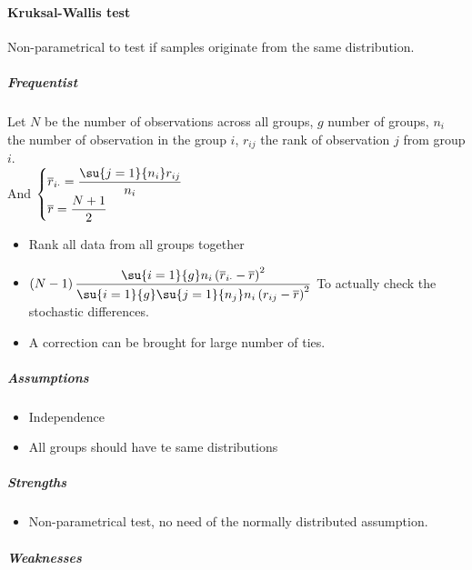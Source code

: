 \paragraph{Kruksal-Wallis test}
Non-parametrical to test if samples originate from the same distribution.
\subparagraph{Frequentist}
Let $N$ be the number of observations across all groups, $g$ number of groups, $n_{i}$ the
number of observation in the group $i$, $r_{ij}$ the rank of observation $j$ from group 
$i$.\\
And 
$\begin{cases}
    \overline{r}_{i\cdot} = \dfrac{\su{j=1}{n_{i}}r_{ij}}{n_{i}} \\
    \overline{r} = \dfrac{N + 1}{2}
\end{cases}$
\begin{itemize}
    \item Rank all data from all groups together
    \item $\left(N-1\right)\dfrac{\su{i=1}{g}n_{i}\left(\overline{r}_{i\cdot} - 
                \overline{r}\right)^{2}}{\su{i=1}{g}\su{j=1}{n_{j}}n_{i}\left(r_{ij} - 
        \overline{r}\right)^{2}}$
        To actually check the stochastic differences.
    \item A correction can be brought for large number of ties.

\end{itemize}

\subparagraph{Assumptions}
\begin{itemize}
    \item Independence
    \item All groups should have te same distributions
\end{itemize}

\subparagraph{Strengths}
\begin{itemize}
    \item Non-parametrical test, no need of the normally distributed assumption.
\end{itemize}

\subparagraph{Weaknesses}

